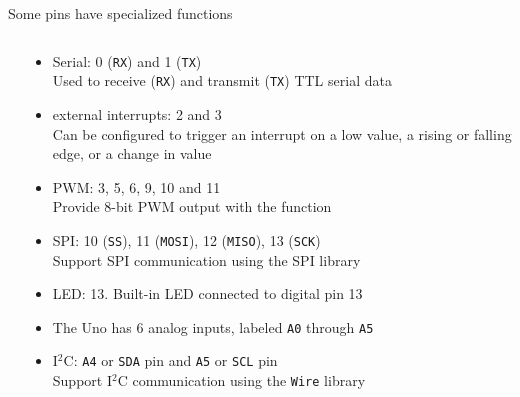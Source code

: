 \documentclass[compress]{beamer}
\begin{document}
\begin{frame}{Some pins have specialized functions}
\begin{columns}
\begin{column}{0.5\linewidth}
        \end{column}
        \begin{column}{0.5\linewidth}
     {
    \begin{itemize}
        \item Serial: 0 (\texttt{RX}) and 1 (\texttt{TX}) \\
                Used to receive (\texttt{RX}) and transmit (\texttt{TX}) TTL
                serial data
        \item external interrupts: 2 and 3 \\
                Can be configured to trigger an interrupt on a low value, a
                rising or falling edge, or a change in value
        \item PWM: 3, 5, 6, 9, 10 and 11 \\
                Provide 8-bit PWM output with the  function
    \end{itemize}
}
     {
        \begin{itemize}
            \item SPI: 10 (\texttt{SS}), 11 (\texttt{MOSI}), 12 (\texttt{MISO}),
                13 (\texttt{SCK}) \\
                 Support SPI communication using the SPI library
            \item LED: 13. Built-in LED connected to digital pin 13
            \item The Uno has 6 analog inputs, labeled \texttt{A0} through
                \texttt{A5}
            \item I$^2$C: \texttt{A4} or \texttt{SDA} pin and \texttt{A5} or
                \texttt{SCL} pin \\
                  Support I$^2$C communication using the \texttt{Wire} library
        \end{itemize}
    }
        \end{column}
    \end{columns}
\end{frame}
\end{document}
